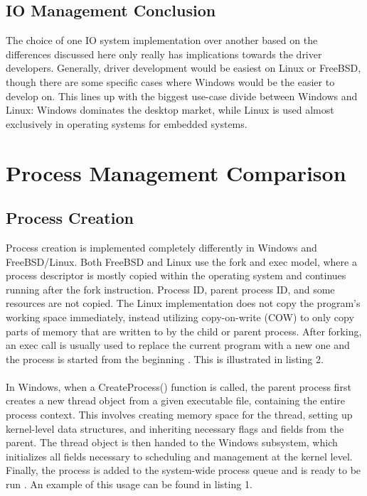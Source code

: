 \documentclass[10pt,draftclsnofoot,onecolumn]{article}
\begin{document}
\subsection{IO Management Conclusion}

The choice of one IO system implementation over another based on the differences discussed here only really has implications towards the driver developers. Generally, driver development would be easiest on Linux or FreeBSD, though there are some specific cases where Windows would be the easier to develop on. This lines up with the biggest use-case divide between Windows and Linux: Windows dominates the desktop market, while Linux is used almost exclusively in operating systems for embedded systems.

\section{Process Management Comparison}

\subsection{Process Creation}

Process creation is implemented completely differently in Windows and FreeBSD/Linux. Both FreeBSD and Linux use the fork and exec model, where a process descriptor is mostly copied within the operating system and continues running after the fork instruction. Process ID, parent process ID, and some resources are not copied. The Linux implementation does not copy the program’s working space immediately, instead utilizing copy-on-write (COW) to only copy parts of memory that are written to by the child or parent process. After forking, an exec call is usually used to replace the current program with a new one and the process is started from the beginning \cite{Wandos}. This is illustrated in listing 2.
\\\\
In Windows, when a CreateProcess() function is called, the parent process first creates a new thread object from a given executable file, containing the entire process context. This involves creating memory space for the thread, setting up kernel-level data structures, and inheriting necessary flags and fields from the parent. The thread object is then handed to the Windows subsystem, which initializes all fields necessary to scheduling and management at the kernel level. Finally, the process is added to the system-wide process queue and is ready to be run \cite{Wandos}. An example of this usage can be found in listing 1.\\
\end{document}
